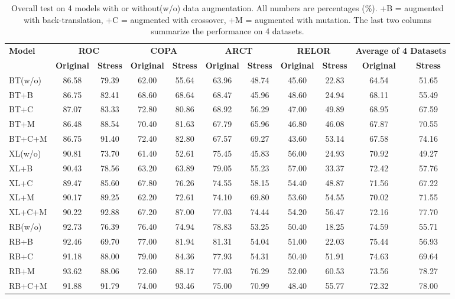 \begin{table}[th]
    \scriptsize
    \centering
        \begin{tabular}{l|cc|cc|cc|cc|cc}\toprule
            \multirow{2}{*}{\textbf{Model}} & \multicolumn{2}{c|}{\bf ROC} & \multicolumn{2}{c|}{\bf COPA} & \multicolumn{2}{c|}{\bf ARCT} & \multicolumn{2}{c|}{\bf RELOR}& \multicolumn{2}{c}{\bf Average of 4 Datasets} \\ \cline{2-11}
            & \textbf{Original} &\textbf{Stress}&\textbf{Original} &\textbf{Stress}&\textbf{Original} &\textbf{Stress}&\textbf{Original} &\textbf{Stress} & \textbf{Original} &\textbf{Stress} \\ \hline
BT(w/o)&86.58&79.39 &62.00&55.64 &63.96&48.74 &45.60&22.83 &64.54 &51.65 \\
BT+B&86.75&82.41 &68.60&68.64 &68.47&45.96 &48.60&24.94 &68.11 &55.49 \\
BT+C&87.07&83.33 &72.80&80.86 &68.92&56.29 &47.00&49.89 &68.95 &67.59 \\
BT+M&86.48&88.54 &70.40&81.63 &67.79&65.96 &46.80&46.08 &67.87 &70.55 \\
BT+C+M&86.75&91.40 &72.40&82.80 &67.57&69.27 &43.60&53.14 &67.58 &74.16 \\
            \midrule
XL(w/o)&90.81&73.70 &61.40&52.61 &75.45&45.83 &56.00&24.93 &70.92 &49.27 \\
XL+B&90.43&78.56 &63.20&63.89 &79.05&55.23 &57.00&33.37 &72.42 &57.76 \\
XL+C&89.47&85.60 &67.80&76.26 &74.55&58.15 &54.40&48.87 &71.56 &67.22 \\
XL+M&90.17&89.25 &62.20&72.61 &74.10&69.80 &53.60&54.55 &70.02 &71.55 \\
XL+C+M&90.22&92.88 &67.20&87.00 &77.03&74.44 &54.20&56.47 &72.16 &77.70 \\
            \midrule
RB(w/o)&92.73&76.39 &76.40&74.94 &78.83&53.25 &50.40&18.25 &74.59 &55.71 \\
RB+B&92.46&69.70 &77.00&81.94 &81.31&54.04 &51.00&22.03 &75.44 &56.93 \\
RB+C&91.18&88.00 &79.00&84.36 &77.93&54.31 &50.40&51.91 &74.63 &69.64 \\
RB+M&93.62&88.06 &72.60&88.17 &77.03&76.29 &52.00&60.53 &73.56 &78.27 \\
RB+C+M&91.88&91.79 &74.00&93.46 &75.00&70.99 &48.40&55.77 &72.32 &78.00 \\
            \bottomrule
        \end{tabular}
    \caption{\label{tab:results} Overall test
        on 4 models with or without(w/o) data augmentation.
        All numbers are percentages (\%). 
        +B = augmented with back-translation,
        +C = augmented with crossover, +M = augmented with mutation.
The last two columns summarize the performance on 4 datasets.}
\end{table}

